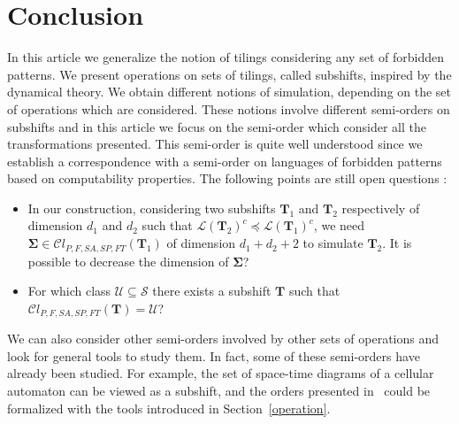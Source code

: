 \documentclass[proceedings]{stacs}
\theoremstyle{plain}\newtheorem{satz}[thm]{Satz}
\theoremstyle{definition}\newtheorem{crucial}[thm]{Crucial Definition}
\newcommand{\T}{\mathbf{T}}
\newcommand{\Tfinal}{\mathbf{\Sigma}}
\newcommand{\shift}{\mathcal{S}}
\newcommand{\Uclass}{\mathcal{U}}
\newcommand{\Lang}{\mathcal{L}}
\begin{document}
\section*{Conclusion}

In this article we generalize the notion of tilings considering any set of forbidden patterns. We present operations on sets of tilings, called subshifts, inspired by the dynamical theory. We obtain different notions of simulation, depending on the set of operations which are considered. These notions involve different semi-orders on subshifts and in this article we focus on the semi-order which consider all the transformations presented. This semi-order is quite well understood since we establish a correspondence with a semi-order on languages of forbidden patterns based on computability properties. The following points are still open questions :
\begin{itemize}
 \item In our construction, considering two subshifts $\T_1$ and $\T_2$ respectively of dimension $d_1$ and $d_2$ such that $\Lang(\T_2)^c\preceq\Lang(\T_1)^c$, we need $\Tfinal\in\mathcal{C}l_{P,F,SA,SP,FT}(\T_1)$ of dimension $d_1+d_2+2$ to simulate $\T_2$. It is possible to decrease the dimension of $\Tfinal$?

 \item For which class $\Uclass\subseteq\shift$ there exists a subshift $\T$ such that $\mathcal{C}l_{P,F,SA,SP,FT}(\T)=\Uclass$?
\end{itemize}

We can also consider other semi-orders involved by other sets of operations and look for general tools to study them. In fact, some of these semi-orders have already been studied. For example, the set of space-time diagrams of a cellular automaton can be viewed as a subshift, and the orders presented in~\cite{mazoyer1999ioc,ollinger2003stacs,theyssier2005acm} could be formalized with the tools introduced in Section~\ref{operation}. 




\end{document}
